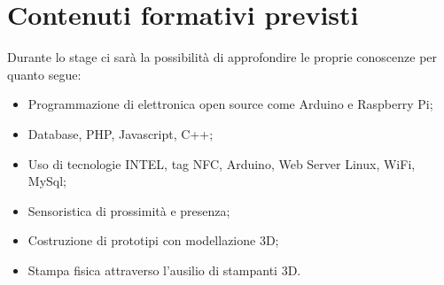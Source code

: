 \section*{Contenuti formativi previsti}
Durante lo stage ci sarà la possibilità di approfondire le proprie conoscenze per quanto segue:
\begin{itemize}
	\item Programmazione di elettronica open source come Arduino e Raspberry Pi;
	\item Database, PHP, Javascript, C++;
	\item Uso di tecnologie INTEL, tag NFC, Arduino, Web Server Linux, WiFi, MySql;
	\item Sensoristica di prossimità e presenza;
	\item Costruzione di prototipi con modellazione 3D;
	\item Stampa fisica attraverso l'ausilio di stampanti 3D.
\end{itemize}
